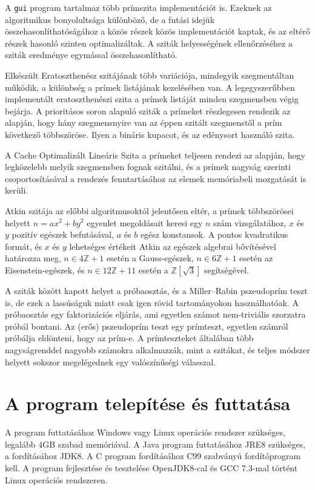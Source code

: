 A \texttt{gui} program tartalmaz több prímszita implementációt is. Ezeknek az algoritmikus bonyolultsága különböző, de a futási idejük összehasonlíthatóságához a közös részek közös implementációt kaptak, és az eltérő részek hasonló szinten optimalizáltak.
A sziták helyességének ellenőrzéséhez a sziták eredménye egymással összehasonlítható.

Elkészült Eratoszthenész szitájának több variációja, mindegyik szegmentáltan működik, a különbség a prímek listájának kezelésében van.
A legegyszerűbben implementált eratoszthenészi szita a prímek listáját minden szegmensben végig bejárja.
A prioritásos soron alapuló sziták a prímeket részlegesen rendezik az alapján, hogy hány szegmensnyire van az éppen szitált szegmenstől a prím következő többszöröse.
Ilyen a bináris kupacot, és az edénysort használó szita.

A Cache Optimalizált Lineáris Szita\cite{cols} a prímeket teljesen rendezi az alapján, hogy legközelebb melyik szegmensben fognak szitálni, és a prímek nagyság szerinti csoportosításával a rendezés fenntartásához az elemek memóriabeli mozgatását is kerüli.

Atkin szitája\cite{atkin} az előbbi algoritmusoktól jelentősen eltér, a prímek többszörösei
helyett $n=ax^2+by^2$ egyenlet megoldásait keresi egy $n$ szám vizsgálatához, $x$ és $y$ pozitív egészek befutásával, $a$ és $b$ egész konstansok.
A pontos kvadratikus formát, és $x$ és $y$ lehetséges értékeit Atkin az egészek algebrai bővítésével határozza meg, $n \in 4\mathbb{Z}+1$ esetén a Gauss-egészek, $n \in 6\mathbb{Z}+1$ esetén az Eisenstein-egészek, és $n \in 12\mathbb{Z}+11$ esetén a $\mathbb{Z}[\sqrt{3}]$ segítségével.

A sziták között kapott helyet a próbaosztás, és a Miller–Rabin pszeudoprím teszt\cite{miller} is, de ezek a lassúságuk miatt csak igen rövid tartományokon használhatóak.
A próbaosztás egy faktorizációs eljárás, ami egyetlen számot nem-triviális szorzatra próbál bontani.
Az (erős) pszeudoprím teszt egy prímteszt, egyetlen számról próbálja eldönteni, hogy az prím-e.
A prímteszteket általában több nagyságrenddel nagyobb számokra alkalmazzák, mint a szitákat, és teljes módszer helyett sokszor megelégednek egy valószínűségi válasszal.

\section{A program telepítése és futtatása}

A program futtatásához Windows vagy Linux operációs rendszer szükséges, legalább 4GB szabad memóriával.
A Java program futtatásához JRE8 szükséges, a fordításához JDK8.
A C program fordításához C99 szabványú fordítóprogram kell.
A program fejlesztése és tesztelése OpenJDK8-cal és GCC 7.3-mal történt Linux operációs rendszeren.

